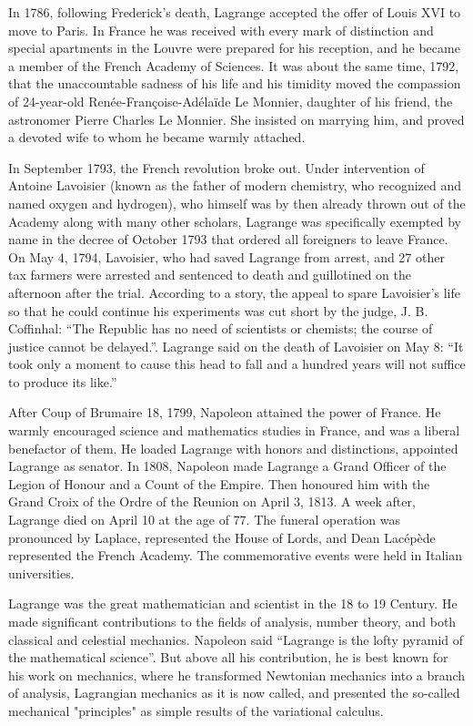 \documentclass{article}
\begin{document}
In 1786, following Frederick's death, Lagrange accepted the offer of Louis XVI to move to Paris. In France he was received with every mark of distinction and special apartments in the Louvre were prepared for his reception, and he became a member of the French Academy of Sciences. It was about the same time, 1792, that the unaccountable sadness of his life and his timidity moved the compassion of 24-year-old Renée-Françoise-Adélaïde Le Monnier, daughter of his friend, the astronomer Pierre Charles Le Monnier. She insisted on marrying him, and proved a devoted wife to whom he became warmly attached.

In September 1793, the French revolution broke out. Under intervention of Antoine Lavoisier (known as the father of modern chemistry, who recognized and named oxygen and hydrogen), who himself was by then already thrown out of the Academy along with many other scholars, Lagrange was specifically exempted by name in the decree of October 1793 that ordered all foreigners to leave France. On May 4, 1794, Lavoisier, who had saved Lagrange from arrest, and 27 other tax farmers were arrested and sentenced to death and guillotined on the afternoon after the trial. According to a story, the appeal to spare Lavoisier's life so that he could continue his experiments was cut short by the judge, J. B. Coffinhal: ``The Republic has no need of scientists or chemists; the course of justice cannot be delayed.''. Lagrange said on the death of Lavoisier on May 8: ``It took only a moment to cause this head to fall and a hundred years will not suffice to produce its like.''\cite{Wiki-Lagrange}

After Coup of Brumaire 18, 1799, Napoleon attained the power of France. He warmly encouraged science and mathematics studies in France, and was a liberal benefactor of them. He loaded Lagrange with honors and distinctions, appointed Lagrange as senator. In 1808, Napoleon made Lagrange a Grand Officer of the Legion of Honour and a Count of the Empire. Then honoured him with the Grand Croix of the Ordre of the Reunion on April 3, 1813. A week after, Lagrange died on April 10 at the age of 77. The funeral operation was pronounced by Laplace, represented the House of Lords, and Dean Lacépède represented the French Academy. The commemorative events were held in Italian universities.

Lagrange was the great mathematician and scientist in the 18 to 19 Century. He made significant contributions to the fields of analysis, number theory, and both classical and celestial mechanics. Napoleon said ``Lagrange is the lofty pyramid of the mathematical science''. But above all his contribution, he is best known for his work on mechanics, where he transformed Newtonian mechanics into a branch of analysis, Lagrangian mechanics as it is now called, and presented the so-called mechanical "principles" as simple results of the variational calculus.
\end{document}
